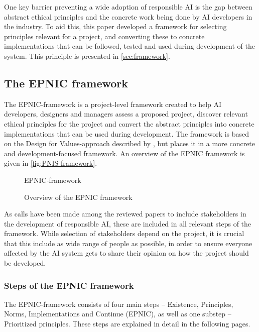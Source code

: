 One key barrier preventing a wide adoption of responsible AI is the gap between abstract ethical principles and the concrete work being done by AI developers in the industry. To aid this, this paper developed a framework for selecting principles relevant for a project, and converting these to concrete implementations that can be followed, tested and used during development of the system. This principle is presented in \autoref{sec:framework}.


\subsection{The EPNIC framework}
\label{sec:framework}
The EPNIC-framework is a project-level framework created to help AI developers, designers and managers assess a proposed project, discover relevant ethical principles for the project and convert the abstract principles into concrete implementations that can be used during development. The framework is based on the Design for Values-approach described by \textcite{Dignum_2019}, but places it in a more concrete and development-focused framework. An overview of the EPNIC framework is given in \autoref{fig:PNIS-framework}.

\begin{figure}[htp]
    \centering
    {EPNIC-framework}
    \caption{Overview of the EPNIC framework}
    \label{fig:PNIS-framework}
\end{figure}

As calls have been made among the reviewed papers to include stakeholders in the development of responsible AI, these are included in all relevant steps of the framework. While selection of stakeholders depend on the project, it is crucial that this include as wide range of people as possible, in order to ensure everyone affected by the AI system gets to share their opinion on how the project should be developed.

\subsubsection{Steps of the EPNIC framework}
The EPNIC-framework consists of four main steps -- Existence, Principles, Norms, Implementations and Continue (EPNIC), as well as one substep -- Prioritized principles. These steps are explained in detail in the following pages.

